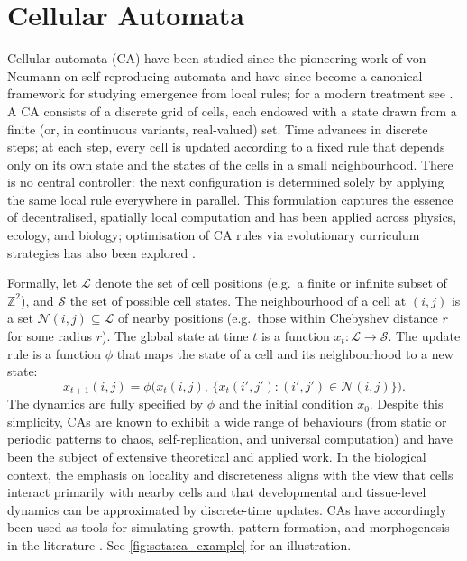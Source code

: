 \section{Cellular Automata}
\label{sec:sota:ca}

Cellular automata (CA) have been studied since the pioneering work of von Neumann on self-reproducing automata \cite{ca_vonneumann1966} and have since become a canonical framework for studying emergence from local rules; for a modern treatment see \cite{ca_hawkins2024}. A CA consists of a discrete grid of cells, each endowed with a state drawn from a finite (or, in continuous variants, real-valued) set. Time advances in discrete steps; at each step, every cell is updated according to a fixed rule that depends only on its own state and the states of the cells in a small neighbourhood. There is no central controller: the next configuration is determined solely by applying the same local rule everywhere in parallel. This formulation captures the essence of decentralised, spatially local computation and has been applied across physics, ecology, and biology; optimisation of CA rules via evolutionary curriculum strategies has also been explored \cite{ca_antal2021}.

Formally, let \(\mathcal{L}\) denote the set of cell positions (e.g.\ a finite or infinite subset of \(\mathbb{Z}^2\)), and \(\mathcal{S}\) the set of possible cell states. The neighbourhood of a cell at \((i,j)\) is a set \(\mathcal{N}(i,j) \subseteq \mathcal{L}\) of nearby positions (e.g.\ those within Chebyshev distance \(r\) for some radius \(r\)). The global state at time \(t\) is a function \(x_t : \mathcal{L} \to \mathcal{S}\). The update rule is a function \(\phi\) that maps the state of a cell and its neighbourhood to a new state:
\begin{equation}
x_{t+1}(i,j) = \phi\bigl( x_t(i,j), \, \{ x_t(i',j') : (i',j') \in \mathcal{N}(i,j) \} \bigr).
\end{equation}
The dynamics are fully specified by \(\phi\) and the initial condition \(x_0\). Despite this simplicity, CAs are known to exhibit a wide range of behaviours (from static or periodic patterns to chaos, self-replication, and universal computation) and have been the subject of extensive theoretical and applied work. In the biological context, the emphasis on locality and discreteness aligns with the view that cells interact primarily with nearby cells and that developmental and tissue-level dynamics can be approximated by discrete-time updates. CAs have accordingly been used as tools for simulating growth, pattern formation, and morphogenesis in the literature \cite{ca_vonneumann1966}. See \cref{fig:sota:ca_example} for an illustration.

